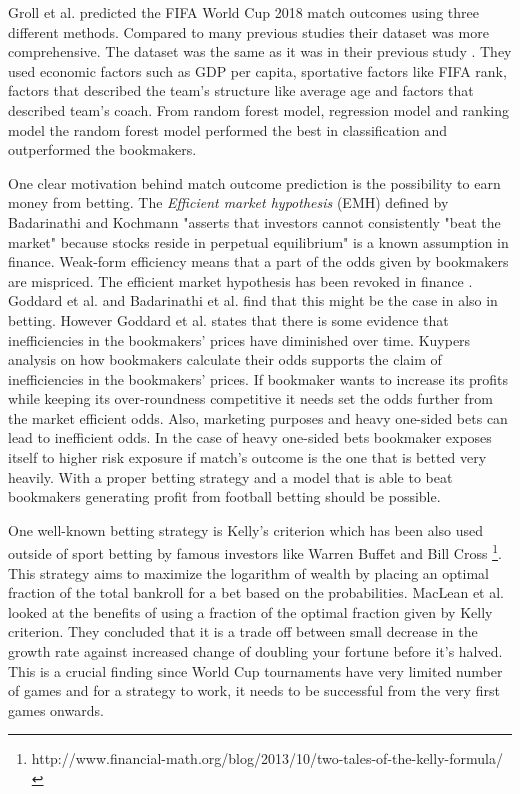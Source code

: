 Groll et al. \cite{groll2018prediction} predicted the FIFA World Cup 2018 match outcomes using three different methods. Compared to many previous studies their dataset was more comprehensive. The dataset was the same as it was in their previous study \cite{groll2015prediction}. They used economic factors such as GDP per capita, sportative factors like FIFA rank, factors that described the team's structure like average age and factors that described team's coach. From random forest model, regression model and ranking model the random forest model performed the best in classification and outperformed the bookmakers.

One clear motivation behind match outcome prediction is the possibility to earn money from betting. The \textit{Efficient market hypothesis} (EMH) defined by Badarinathi and Kochmann \cite{badarinathi1996football} "asserts that investors cannot consistently "beat the market" because stocks reside in perpetual equilibrium" is a known assumption in finance. Weak-form efficiency means that a part of the odds given by bookmakers are mispriced. The efficient market hypothesis has been revoked in finance \cite{jegadeesh1993returns}. Goddard et al. and Badarinathi et al. \cite{goddard2003modelling, badarinathi1996football} find that this might be the case in also in betting. However Goddard et al. \cite{goddard2003modelling} states that there is some evidence that inefficiencies in the bookmakers’ prices have diminished over time. Kuypers \cite{kuypers2008} analysis on how bookmakers calculate their odds supports the claim of inefficiencies in the bookmakers’ prices. If bookmaker wants to increase its profits while keeping its over-roundness competitive it needs set the odds further from the market efficient odds. Also, marketing purposes and heavy one-sided bets can lead to inefficient odds. In the case of heavy one-sided bets bookmaker exposes itself to higher risk exposure if match's outcome is the one that is betted very heavily. With a proper betting strategy and a model that is able to beat bookmakers generating profit from football betting should be possible.

One well-known betting strategy is Kelly's criterion which has been also used outside of sport betting by famous investors like Warren Buffet and Bill Cross \footnote{http://www.financial-math.org/blog/2013/10/two-tales-of-the-kelly-formula/}. This strategy aims to maximize the logarithm of wealth by placing an optimal fraction of the total bankroll for a bet based on the probabilities. MacLean et al. \cite{maclean1992growth} looked at the benefits of using a fraction of the optimal fraction given by Kelly criterion. They concluded that it is a trade off between small decrease in the growth rate against increased change of doubling your fortune before it's halved. This is a crucial finding since World Cup tournaments have very limited number of games and for a strategy to work, it needs to be successful from the very first games onwards.



